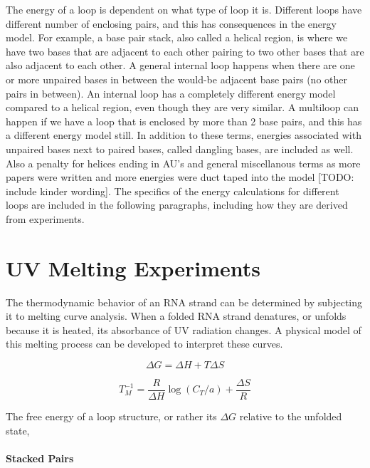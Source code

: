 The energy of a loop is dependent on what type of loop it
is. Different loops have different number of enclosing pairs, and this
has consequences in the energy model. For example, a base pair stack,
also called a helical region, is where we have two bases that are
adjacent to each other pairing to two other bases that are also
adjacent to each other. A general internal loop happens when there are
one or more unpaired bases in between the would-be adjacent base pairs
(no other pairs in between). An internal loop has a completely
different energy model compared to a helical region, even though they
are very similar. A multiloop can happen if we have a loop that is
enclosed by more than 2 base pairs, and this has a different energy
model still. In addition to these terms, energies associated with
unpaired bases next to paired bases, called dangling bases, are
included as well. Also a penalty for helices ending in AU's and
general miscellanous terms as more papers were written and more
energies were duct taped into the model [TODO: include kinder
wording]. The specifics of the energy calculations for different loops
are included in the following paragraphs, including how they are
derived from experiments.

\section{UV Melting Experiments}

The thermodynamic behavior of an RNA strand can be determined by
subjecting it to melting curve analysis. When a folded RNA strand
denatures, or unfolds because it is heated, its absorbance of UV
radiation changes. A physical model of this melting process can be
developed to interpret these curves.

\begin{equation}
\Delta G = \Delta H + T \Delta S
\end{equation}

\begin{equation}
T_M^{-1} = \frac{R}{\Delta H} \log{(C_T/a)} + \frac{\Delta S}{R}
\end{equation}

The free energy of a loop structure, or rather its $\Delta G$ relative
to the unfolded state,

\paragraph{Stacked Pairs}

